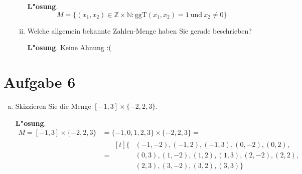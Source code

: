 \documentclass[10pt, a4paper, oneside]{article}
\begin{document}
\begin{enumerate}[(a)]
\begin{enumerate}[i)]
                \textbf{L"osung}.
                $$M = \{ (x_1, x_2) \in \mathbb{Z} \times \mathbb{N} : \text{ggT}(x_1, x_2) = 1\ \text{und}\ x_2 \neq 0 \}$$

            \item Welche allgemein bekannte Zahlen-Menge haben Sie gerade beschrieben?

                \textbf{L"osung}.
                Keine Ahnung :(
          \end{enumerate}
\end{enumerate}

\section{Aufgabe 6}

\begin{enumerate}[(a)]
    \item Skizzieren Sie die Menge $[-1, 3] \times \{-2,2,3\}$.

        \textbf{L"osung}.
        \begin{align*}
            M = [-1, 3] \times \{-2,2,3\} &= \{-1, 0, 1, 2, 3\} \times \{-2, 2, 3\} = \\
                                          &=
                    \begin{aligned}[t]
                        \{&(-1, -2), (-1, 2), (-1, 3), (0, -2), (0, 2),\\
                          &(0, 3), (1, -2), (1, 2), (1, 3), (2, -2), (2, 2),\\
                          &(2, 3), (3, -2), (3, 2), (3, 3)\}
                    \end{aligned}
        \end{align*}


\end{enumerate}
\end{document}
